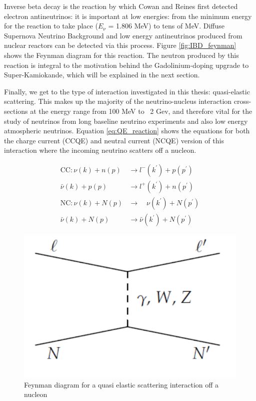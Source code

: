 Inverse beta decay is the reaction by which Cowan and Reines first detected electron antineutrinos: it is important at low energies: from the minimum energy for the reaction to take place ($E_{\nu}$ = 1.806 MeV) to tens of MeV. Diffuse Supernova Neutrino Background and low energy antineutrinos produced from nuclear reactors can be detected via this process. Figure \ref{fig:IBD_feynman} shows the Feynman diagram for this reaction. The neutron produced by this reaction is integral to the motivation behind the Gadolinium-doping upgrade to Super-Kamiokande, which will be explained in the next section.

Finally, we get to the type of interaction investigated in this thesis: quasi-elastic scattering. This makes up the majority of the neutrino-nucleus interaction cross-sections at the energy range from 100 MeV to ~2 Gev, and therefore vital for the study of neutrinos from long baseline neutrino experiments and also low energy atmospheric neutrinos. Equation \ref{eq:QE_reaction} shows the equations for both the charge current (CCQE) and neutral current (NCQE) version of this interaction where the incoming neutrino scatters off a nucleon.

$$
\begin{aligned}
\mathrm{CC}: \nu(k)+n(p) & \rightarrow l^{-}\left(k^{\prime}\right)+p\left(p^{\prime}\right) \\
\bar{\nu}(k)+p(p) & \rightarrow l^{+}\left(k^{\prime}\right)+n\left(p^{\prime}\right) \\
\mathrm{NC}: \nu(k)+N(p) & \rightarrow \quad \nu\left(k^{\prime}\right)+N\left(p^{\prime}\right) \\
\bar{\nu}(k)+N(p) & \rightarrow \bar{\nu}\left(k^{\prime}\right)+N\left(p^{\prime}\right)
\end{aligned}
\label{eq:QE_reaction}
$$

\begin{figure}
    \includegraphics[width=\textwidth]{Figures/QE_feynman.png}
    \caption{Feynman diagram for a quasi elastic scattering interaction off a nucleon}
    \label{fig:QE_reaction}
\end{figure}


